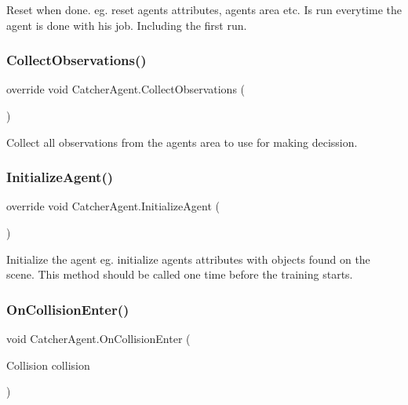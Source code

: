 Reset when done. eg. reset agents attributes, agents area etc. Is run everytime the agent is done with his job. Including the first run. 

\mbox{\label{class_catcher_agent_ab8de74f6eb16a987980e951a442ab247}} 
\subsubsection{\texorpdfstring{CollectObservations()}{CollectObservations()}}
{\footnotesize\ttfamily override void Catcher\+Agent.\+Collect\+Observations (\begin{DoxyParamCaption}{ }\end{DoxyParamCaption})}



Collect all observations from the agents area to use for making decission. 

\mbox{\label{class_catcher_agent_aeb871db4779f1da715e829b40c6087b0}} 
\subsubsection{\texorpdfstring{InitializeAgent()}{InitializeAgent()}}
{\footnotesize\ttfamily override void Catcher\+Agent.\+Initialize\+Agent (\begin{DoxyParamCaption}{ }\end{DoxyParamCaption})}



Initialize the agent eg. initialize agents attributes with objects found on the scene. This method should be called one time before the training starts. 

\mbox{\label{class_catcher_agent_a16a95360c49d63206557576218ca42d2}} 
\subsubsection{\texorpdfstring{OnCollisionEnter()}{OnCollisionEnter()}}
{\footnotesize\ttfamily void Catcher\+Agent.\+On\+Collision\+Enter (\begin{DoxyParamCaption}\item[{Collision}]{collision }\end{DoxyParamCaption})\hspace{0.3cm}{\ttfamily [private]}}



